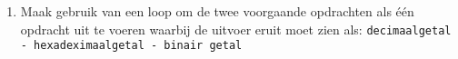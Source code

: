 \begin{enumerate}
\item Maak gebruik van een loop om de twee voorgaande opdrachten als \'e\'en opdracht uit te voeren waarbij de uitvoer eruit moet zien als: \texttt{decimaalgetal - hexadeximaalgetal - binair getal}
\end{enumerate}

